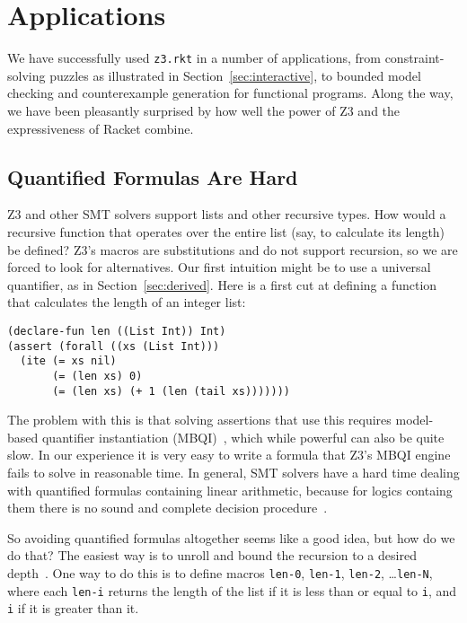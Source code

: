 \section{Applications}

We have successfully used \texttt{z3.rkt} in a number of applications, from
constraint-solving puzzles as illustrated in Section~\ref{sec:interactive}, to
bounded model checking and counterexample generation for functional programs.
Along the way, we have been pleasantly surprised by how well the power of Z3
and the expressiveness of Racket combine.

\subsection{Quantified Formulas Are Hard}

Z3 and other SMT solvers support lists and other recursive types. How would a
recursive function that operates over the entire list (say, to calculate its
length) be defined? Z3's macros are substitutions and do not support
recursion, so we are forced to look for alternatives. Our first intuition
might be to use a universal quantifier, as in Section~\ref{sec:derived}. Here
is a first cut at defining a function that calculates the length of an integer
list:

\begin{verbatim}
(declare-fun len ((List Int)) Int)
(assert (forall ((xs (List Int)))
  (ite (= xs nil)
       (= (len xs) 0)
       (= (len xs) (+ 1 (len (tail xs)))))))
\end{verbatim}

The problem with this is that solving assertions that use this requires model-
based quantifier instantiation (MBQI)~\cite{mbqi}, which while powerful can
also be quite slow. In our experience it is very easy to write a formula that
Z3's MBQI engine fails to solve in reasonable time. In general, SMT solvers
have a hard time dealing with quantified formulas containing linear
arithmetic, because for logics containg them there is no sound and complete
decision procedure~\cite{halpern91}.

So avoiding quantified formulas altogether seems like a good idea, but how do
we do that? The easiest way is to unroll and bound the recursion to a desired
depth~\cite{sat-recursive}. One way to do this is to define macros
\texttt{len-0}, \texttt{len-1}, \texttt{len-2}, \ldots \texttt{len-N}, where
each \texttt{len-i} returns the length of the list if it is less than or equal
to \texttt{i}, and \texttt{i} if it is greater than it.

